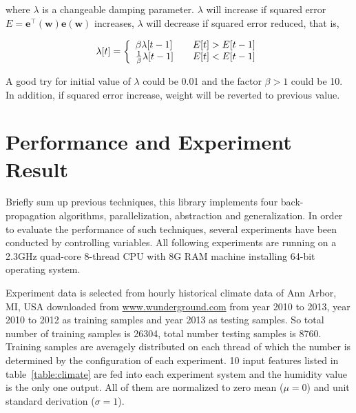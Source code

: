 \documentclass[procedia]{easychair}
\begin{document}
where $\lambda$ is a changeable damping parameter.  $\lambda$ will increase if squared error $E = \mathbf{e} ^ \top ( \mathbf{w} ) \mathbf{e} ( \mathbf{w} )$ increases, $\lambda$ will decrease if squared error reduced, that is,

\begin{equation}
    \lambda [t] = \left \{
    \begin{array}{l l}
        \beta \lambda [ t - 1 ] & \quad E[t] > E[ t - 1 ] \\
        \frac{1}{\beta} \lambda [ t - 1 ] & \quad E[t] < E[ t - 1 ]
    \end{array} \right. \notag
\end{equation}

A good try for initial value of $\lambda$ could be 0.01 and the factor $\beta > 1$ could be 10.  In addition, if squared error increase, weight will be reverted to previous value.


\section{Performance and Experiment Result}

Briefly sum up previous techniques, this library implements four back-propagation algorithms, parallelization, abstraction and generalization.  In order to evaluate the performance of such techniques, several experiments have been conducted by controlling variables.  All following experiments are running on a 2.3GHz quad-core 8-thread CPU with 8G RAM machine installing 64-bit operating system.

Experiment data is selected from hourly historical climate data of Ann Arbor, MI, USA downloaded from \url{www.wunderground.com} from year 2010 to 2013, year 2010 to 2012 as training samples and year 2013 as testing samples.  So total number of training samples is 26304, total number testing samples is 8760.  Training samples are averagely distributed on each thread of which the number is determined by the configuration of each experiment.  10 input features listed in table~\ref{table:climate} are fed into each experiment system and the humidity value is the only one output.  All of them are normalized to zero mean ($\mu = 0$) and unit standard derivation ($\sigma = 1$).
\end{document}
